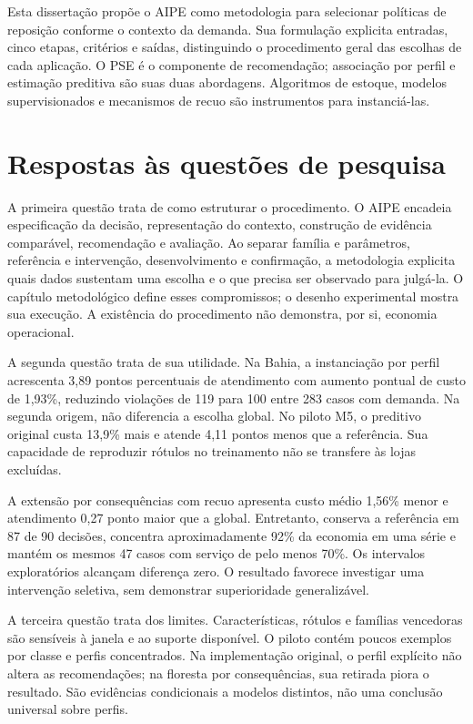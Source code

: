 
Esta dissertação propõe o AIPE como metodologia para selecionar políticas de reposição conforme o contexto da demanda. Sua formulação explicita entradas, cinco etapas, critérios e saídas, distinguindo o procedimento geral das escolhas de cada aplicação. O PSE é o componente de recomendação; associação por perfil e estimação preditiva são suas duas abordagens. Algoritmos de estoque, modelos supervisionados e mecanismos de recuo são instrumentos para instanciá-las.

\section{Respostas às questões de pesquisa}
A primeira questão trata de como estruturar o procedimento. O AIPE encadeia especificação da decisão, representação do contexto, construção de evidência comparável, recomendação e avaliação. Ao separar família e parâmetros, referência e intervenção, desenvolvimento e confirmação, a metodologia explicita quais dados sustentam uma escolha e o que precisa ser observado para julgá-la. O capítulo metodológico define esses compromissos; o desenho experimental mostra sua execução. A existência do procedimento não demonstra, por si, economia operacional.

A segunda questão trata de sua utilidade. Na Bahia, a instanciação por perfil acrescenta 3,89 pontos percentuais de atendimento com aumento pontual de custo de 1,93\%, reduzindo violações de 119 para 100 entre 283 casos com demanda. Na segunda origem, não diferencia a escolha global. No piloto M5, o preditivo original custa 13,9\% mais e atende 4,11 pontos menos que a referência. Sua capacidade de reproduzir rótulos no treinamento não se transfere às lojas excluídas.

A extensão por consequências com recuo apresenta custo médio 1,56\% menor e atendimento 0,27 ponto maior que a global. Entretanto, conserva a referência em 87 de 90 decisões, concentra aproximadamente 92\% da economia em uma série e mantém os mesmos 47 casos com serviço de pelo menos 70\%. Os intervalos exploratórios alcançam diferença zero. O resultado favorece investigar uma intervenção seletiva, sem demonstrar superioridade generalizável.

A terceira questão trata dos limites. Características, rótulos e famílias vencedoras são sensíveis à janela e ao suporte disponível. O piloto contém poucos exemplos por classe e perfis concentrados. Na implementação original, o perfil explícito não altera as recomendações; na floresta por consequências, sua retirada piora o resultado. São evidências condicionais a modelos distintos, não uma conclusão universal sobre perfis.

